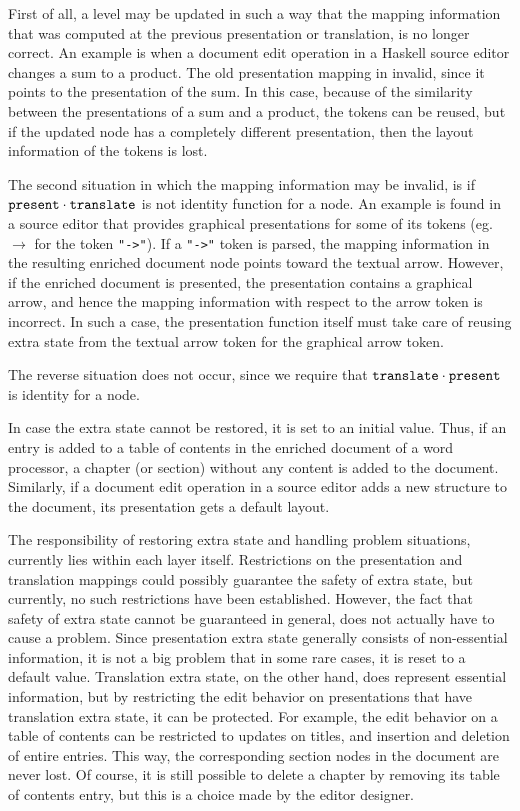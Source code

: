 First of all, a level may be updated in such a way that the mapping information that was computed at the previous presentation or translation, is no longer correct. An example is when a document edit operation in a Haskell source editor changes a sum to a product. The old presentation mapping in invalid, since it points to the presentation of the sum. In this case, because of the similarity between the presentations of a sum and a product, the tokens can be reused, but if the updated node has a completely different presentation, then the layout information of the tokens is lost.

The second situation in which the mapping information may be invalid, is if 
${\tt present} \cdot {\tt translate}$ is not identity function for a node.  An example is found in a source editor that provides graphical presentations for some of its tokens (eg. $\rightarrow$ for the token \verb|"->"|). If a \verb|"->"| token is parsed, the mapping information in the resulting enriched document node points toward the textual arrow. However, if the enriched document is presented, the presentation contains a graphical arrow, and hence the mapping information with respect to the arrow token is incorrect. In such a case, the presentation function itself must take care of reusing extra state from the textual arrow token for the graphical arrow token.

The reverse situation does not occur, since we require that ${\tt translate} \cdot {\tt present}$ is identity for a node. 

In case the extra state cannot be restored, it is set to an initial value. Thus, if an entry is added to a table of contents in the enriched document of a word processor, a chapter (or section) without any content is added to the document. Similarly, if a document edit operation in a source editor adds a new structure to the document, its presentation gets a default layout.

The responsibility of restoring extra state and handling problem situations, currently lies within each layer itself. Restrictions on the presentation and translation mappings could possibly guarantee the safety of extra state, but currently, no such restrictions have been established. However, the fact that safety of extra state cannot be guaranteed in general, does not actually have to cause a problem. Since presentation extra state generally consists of non-essential information, it is not a big problem that in some rare cases, it is reset to a default value.  Translation extra state, on the other hand, does represent essential information, but by restricting the edit behavior on presentations that have translation extra state, it can be protected. For example, the edit behavior on a table of contents can be restricted to updates on titles, and insertion and deletion of entire entries. This way, the corresponding section nodes in the document are never lost. Of course, it is still possible to delete a chapter by removing its table of contents entry, but this is a choice made by the editor designer. 

